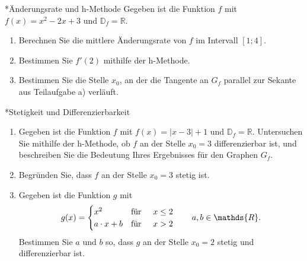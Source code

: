 

\begin{uebung}*{Änderungsrate und h-Methode}
Gegeben ist die Funktion $f$ mit $f(x) = x^2-2x+3$ und $\mathds{D}_f = \mathds{R}$.
\begin{enumerate}[label=\alph*)]
  \item Berechnen Sie die mittlere Änderungsrate von $f$ im Intervall $[1;4]$.
  \item Bestimmen Sie $f'(2)$ mithilfe der h-Methode.
  \item Bestimmen Sie die Stelle $x_0$, an der die Tangente an $G_f$ parallel zur Sekante aus Teilaufgabe a) verläuft.
\end{enumerate}
\end{uebung}

\begin{uebung}*{Stetigkeit und Differenzierbarkeit}
\begin{enumerate}[label=\alph*)]
  \item Gegeben ist die Funktion $f$ mit $f(x) = |x-3|+1$ und $\mathds{D}_f = \mathds{R}$. Untersuchen Sie mithilfe der h-Methode, ob $f$ an der Stelle $x_0 = 3$ differenzierbar ist, und beschreiben Sie die Bedeutung Ihres Ergebnisses für den Graphen $G_f$.
  \item Begründen Sie, dass $f$ an der Stelle $x_0 = 3$ stetig ist.
  \item Gegeben ist die Funktion $g$ mit
  $$g(x)= \begin{cases}
              x^2 & \text{für}\hspace{0.5cm} x\leq 2\\
              a\cdot x+b & \text{für}\hspace{0.5cm}  x> 2
         \end{cases}\qquad a,b\in\mathds{R}.$$
  Bestimmen Sie $a$ und $b$ so, dass $g$ an der Stelle $x_0=2$ stetig und differenzierbar ist.
\end{enumerate}
\end{uebung}


